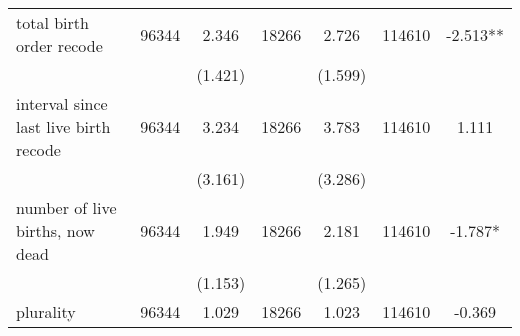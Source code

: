 \begin{tabular}{@{\extracolsep{5pt}}lcccccc}
total birth order recode   & 96344    & 2.346    & 18266    & 2.726    & 114610    & -2.513**   \\                                                                                                                                                                                                                                                                                                     
 &   & (1.421)  &   & (1.599)  &   &  \\ [1ex]                                                                                                                                                                                                                                                                                                                                                         
interval since last live birth recode   & 96344    & 3.234    & 18266    & 3.783    & 114610    & 1.111   \\                                                                                                                                                                                                                                                                                           
 &   & (3.161)  &   & (3.286)  &   &  \\ [1ex]                                                                                                                                                                                                                                                                                                                                                         
number of live births, now dead   & 96344    & 1.949    & 18266    & 2.181    & 114610    & -1.787*   \\                                                                                                                                                                                                                                                                                               
 &   & (1.153)  &   & (1.265)  &   &  \\ [1ex]                                                                                                                                                                                                                                                                                                                                                         
plurality   & 96344    & 1.029    & 18266    & 1.023    & 114610    & -0.369   \\                                                                                                                                                                                                                                                                                                                      

\end{tabular}
